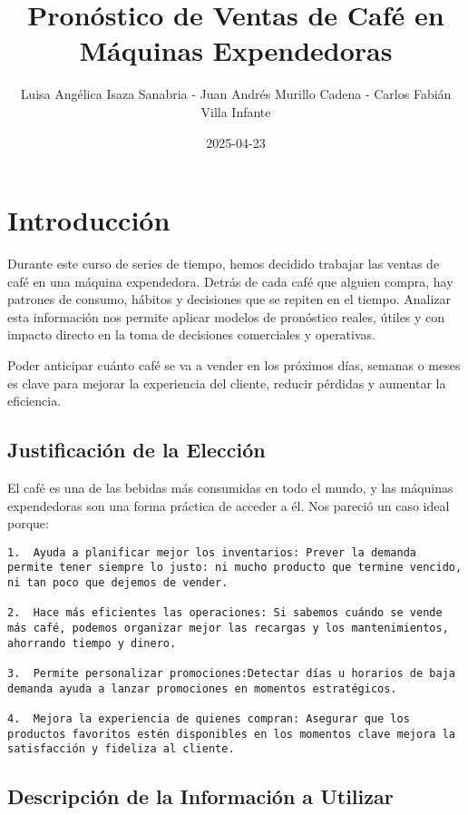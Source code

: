 \documentclass[
]{book}
\title{Pronóstico de Ventas de Café en Máquinas Expendedoras}
\author{Luisa Angélica Isaza Sanabria - Juan Andrés Murillo Cadena - Carlos Fabián Villa Infante}
\date{2025-04-23}
\begin{document}
\maketitle

{
\setcounter{tocdepth}{1}
\tableofcontents
}
\chapter{Introducción}\label{introducciuxf3n}

Durante este curso de series de tiempo, hemos decidido trabajar las ventas de café en una máquina expendedora. Detrás de cada café que alguien compra, hay patrones de consumo, hábitos y decisiones que se repiten en el tiempo. Analizar esta información nos permite aplicar modelos de pronóstico reales, útiles y con impacto directo en la toma de decisiones comerciales y operativas.

Poder anticipar cuánto café se va a vender en los próximos días, semanas o meses es clave para mejorar la experiencia del cliente, reducir pérdidas y aumentar la eficiencia.

\section{Justificación de la Elección}\label{justificaciuxf3n-de-la-elecciuxf3n}

El café es una de las bebidas más consumidas en todo el mundo, y las máquinas expendedoras son una forma práctica de acceder a él. Nos pareció un caso ideal porque:

\begin{verbatim}
1.  Ayuda a planificar mejor los inventarios: Prever la demanda permite tener siempre lo justo: ni mucho producto que termine vencido, ni tan poco que dejemos de vender.

2.  Hace más eficientes las operaciones: Si sabemos cuándo se vende más café, podemos organizar mejor las recargas y los mantenimientos, ahorrando tiempo y dinero.

3.  Permite personalizar promociones:Detectar días u horarios de baja demanda ayuda a lanzar promociones en momentos estratégicos.

4.  Mejora la experiencia de quienes compran: Asegurar que los productos favoritos estén disponibles en los momentos clave mejora la satisfacción y fideliza al cliente.
\end{verbatim}

\section{Descripción de la Información a Utilizar}\label{descripciuxf3n-de-la-informaciuxf3n-a-utilizar}
\end{document}
